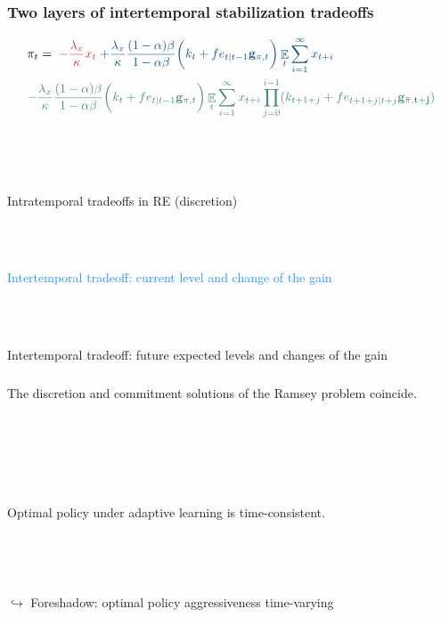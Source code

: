 \documentclass[10pt]{beamer}
\DeclareMathOperator{\E}{\mathbb{E}}
\begin{document}
\begin{frame}
	\frametitle{Two layers of intertemporal stabilization tradeoffs}
\small{
\begin{align*}
& \pi_t  =  \; \textcolor{brownreddark}{-\frac{\lambda_x}{\kappa} x_t} \textcolor{dodgerblue}{ \; + \frac{\lambda_x}{\kappa} \frac{(1-\alpha)\beta}{1-\alpha\beta} \bigg(k_t+ fe_{t|t-1}\mathbf{g}_{\pi,t} \bigg)\E_t\sum_{i=1}^{\infty}x_{t+i}}  \\
& \textcolor{aquamarinegreen}{- \frac{\lambda_x}{\kappa} \frac{(1-\alpha)\beta}{1-\alpha\beta} \bigg(k_t+ fe_{t|t-1}\mathbf{g}_{\pi,t} \bigg)\E_t\sum_{i=1}^{\infty}x_{t+i}\prod_{j=0}^{i-1}(k_{t+1+j}+ fe_{t+1+j|t+j}\mathbf{g_{\bar{\pi},t+j}} )}
\end{align*}

\

\

\textcolor{brownreddark}{Intratemporal tradeoffs in RE (discretion)} \\

\

\

\textcolor{dodgerblue}{Intertemporal tradeoff: current level and change of the gain } \\

\

\

\textcolor{aquamarinegreen}{Intertemporal tradeoff: future expected levels and changes of the gain}

}
\end{frame}

\begin{frame}
	\frametitle{}
	\label{no_commitment}

\begin{lemma} The discretion and commitment solutions of the Ramsey problem coincide. 
\end{lemma}

\

\hfill \hyperlink{no_commitment_intuition}{}

\

\

\begin{corollary} Optimal policy under adaptive learning is time-consistent. 
\end{corollary}


\

\

$\hookrightarrow $ Foreshadow: optimal policy aggressiveness time-varying

\vfill




\end{frame}
\end{document}
